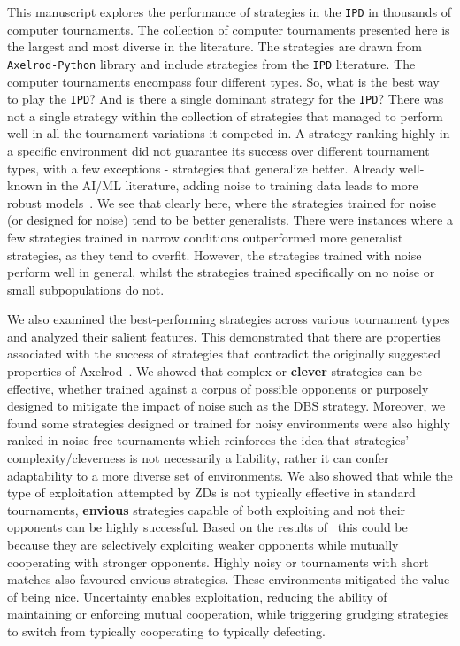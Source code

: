 \documentclass{article}
\newcommand{\numberofstrategies}{}
\def\axelrod{\texttt{Axelrod-Python}}
\def\IPD{\texttt{IPD}}
\begin{document}
This manuscript explores the performance of \numberofstrategies strategies in
the \IPD{} in thousands of computer tournaments. The collection of computer
tournaments presented here is the largest and most diverse in the literature.
The \numberofstrategies strategies are drawn from \axelrod{} library and include
strategies from the \IPD{} literature. The computer tournaments encompass four
different types. So, what is the best way to play the \IPD{}? And is there a
single dominant strategy for the \IPD{}? There was not a single strategy within
the collection of \numberofstrategies strategies that managed to perform well in
all the tournament variations it competed in. A strategy ranking highly in a
specific environment did not guarantee its success over different tournament
types, with a few exceptions - strategies that generalize better. Already
well-known in the AI/ML literature, adding noise to training data leads to more
robust models~\cite{Bishop1995}. We see that clearly here, where the strategies trained for noise
(or designed for noise) tend to be better generalists. There were instances
where a few strategies trained in narrow conditions outperformed more generalist
strategies, as they tend to overfit. However, the strategies trained with noise
perform well in general, whilst the strategies trained specifically on no noise
or small subpopulations do not.

We also examined the best-performing strategies across various tournament
types and analyzed their salient features. This demonstrated that there are
properties associated with the success of strategies that contradict the
originally suggested properties of Axelrod~\cite{Axelrod1981}.
We showed that complex or \textbf{clever} strategies can be effective, whether
trained against a corpus of possible opponents or purposely designed to mitigate
the impact of noise such as the DBS strategy. Moreover, we found some
strategies designed or trained for noisy environments were also highly ranked in
noise-free tournaments which reinforces the idea that strategies'
complexity/cleverness is not necessarily a liability, rather it can confer
adaptability to a more diverse set of environments.
We also showed that while the type of exploitation attempted by ZDs is
not typically effective in standard tournaments, \textbf{envious} strategies
capable of both exploiting and not their opponents can be highly successful.
Based on the results of~\cite{Harper2017} this could be because they are
selectively exploiting weaker opponents while mutually cooperating with stronger
opponents. Highly noisy or tournaments with short matches also favoured envious
strategies. These environments mitigated the value of being nice. Uncertainty
enables exploitation, reducing the ability of maintaining or enforcing mutual
cooperation, while triggering grudging strategies to switch from typically
cooperating to typically defecting.
\end{document}
